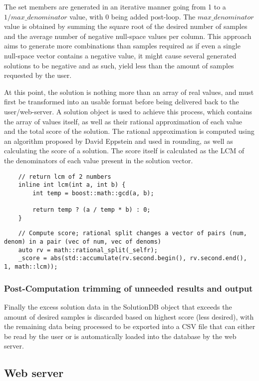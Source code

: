 The set members are generated in an iterative manner going from 1 to a $1/max\_denominator$ value, with 0 being added post-loop. The $max\_denominator$ value is obtained by summing the square root of the desired number of samples and the average number of negative null-space values per column. This approach aims to generate more combinations than samples required as if even a single null-space vector contains a negative value, it might cause several generated solutions to be negative and as such, yield less than the amount of samples requested by the user. 

At this point, the solution is nothing more than an array of real values, and must first be transformed into an usable format before being delivered back to the user/web-server. A solution object is used to achieve this process, which contains the array of values itself, as well as their rational approximation of each value and the total score of the solution. The rational approximation is computed using an algorithm proposed by David Eppstein \cite{eppstein1993} and used in rounding, as well as calculating the score of a solution. The score itself is calculated as the LCM of the denominators of each value present in the solution vector.
\begin{verbatim}
    // return lcm of 2 numbers
	inline int lcm(int a, int b) {
		int temp = boost::math::gcd(a, b);

		return temp ? (a / temp * b) : 0;
	}
\end{verbatim}
\begin{verbatim}
    // Compute score; rational split changes a vector of pairs (num, denom) in a pair (vec of num, vec of denoms)
	auto rv = math::rational_split(_selfr);
	_score = abs(std::accumulate(rv.second.begin(), rv.second.end(), 1, math::lcm));
\end{verbatim}


\subsubsection{Post-Computation trimming of unneeded results and output}
Finally the excess solution data in the SolutionDB object that exceeds the amount of desired samples is discarded based on highest score (less desired), with the remaining data being processed to be exported into a CSV file that can either be read by the user or is automatically loaded into the database by the web server. \\

\subsection{Web server}
